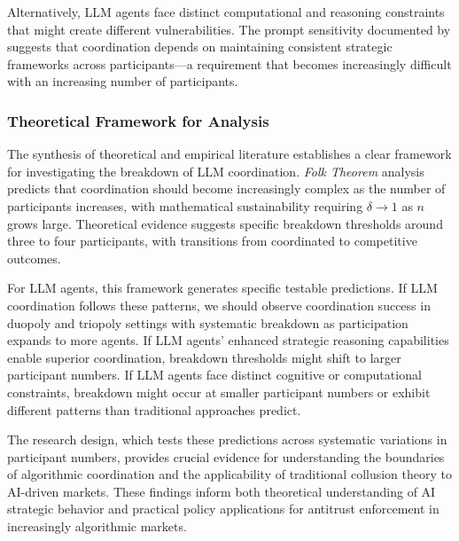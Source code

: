 Alternatively, LLM agents face distinct computational and reasoning constraints that might create different vulnerabilities. The prompt sensitivity documented by \textcite{fish_algorithmic_2025} suggests that coordination depends on maintaining consistent strategic frameworks across participants---a requirement that becomes increasingly difficult with an increasing number of participants.

\subsubsection*{Theoretical Framework for Analysis}

The synthesis of theoretical and empirical literature establishes a clear framework for investigating the breakdown of LLM coordination. \emph{Folk Theorem} analysis predicts that coordination should become increasingly complex as the number of participants increases, with mathematical sustainability requiring $\delta \rightarrow 1$ as $n$ grows large. Theoretical evidence suggests specific breakdown thresholds around three to four participants, with transitions from coordinated to competitive outcomes.

For LLM agents, this framework generates specific testable predictions. If LLM coordination follows these patterns, we should observe coordination success in duopoly and triopoly settings with systematic breakdown as participation expands to more agents. If LLM agents' enhanced strategic reasoning capabilities enable superior coordination, breakdown thresholds might shift to larger participant numbers. If LLM agents face distinct cognitive or computational constraints, breakdown might occur at smaller participant numbers or exhibit different patterns than traditional approaches predict.

The research design, which tests these predictions across systematic variations in participant numbers, provides crucial evidence for understanding the boundaries of algorithmic coordination and the applicability of traditional collusion theory to AI-driven markets. These findings inform both theoretical understanding of AI strategic behavior and practical policy applications for antitrust enforcement in increasingly algorithmic markets.